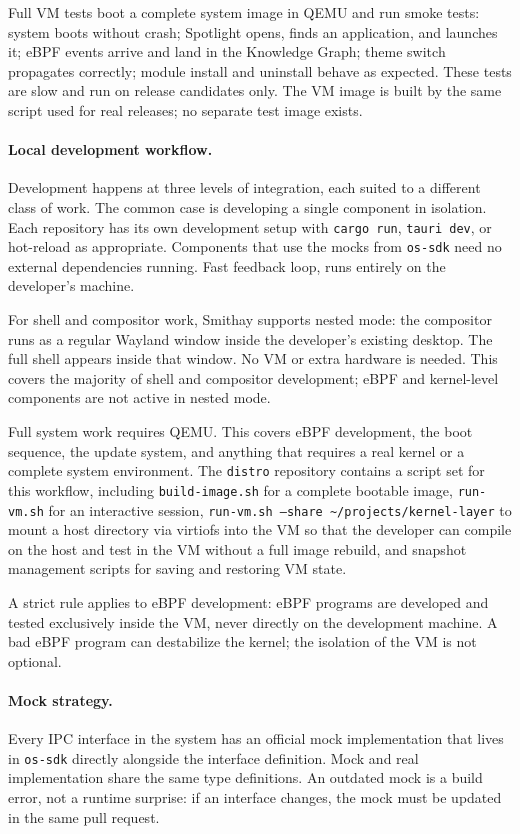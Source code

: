 Full VM tests boot a complete system image in QEMU and run smoke tests: system
boots without crash; Spotlight opens, finds an application, and launches it;
eBPF events arrive and land in the Knowledge Graph; theme switch propagates
correctly; module install and uninstall behave as expected. These tests are
slow and run on release candidates only. The VM image is built by the same
script used for real releases; no separate test image exists.

\paragraph{Local development workflow.}
Development happens at three levels of integration, each suited to a different
class of work. The common case is developing a single component in isolation.
Each repository has its own development setup with \texttt{cargo run},
\texttt{tauri dev}, or hot-reload as appropriate. Components that use the mocks
from \texttt{os-sdk} need no external dependencies running. Fast feedback loop,
runs entirely on the developer's machine.

For shell and compositor work, Smithay supports nested mode: the compositor
runs as a regular Wayland window inside the developer's existing desktop. The
full shell appears inside that window. No VM or extra hardware is needed. This
covers the majority of shell and compositor development; eBPF and kernel-level
components are not active in nested mode.

Full system work requires QEMU. This covers eBPF development, the boot
sequence, the update system, and anything that requires a real kernel or a
complete system environment. The \texttt{distro} repository contains a script
set for this workflow, including \texttt{build-image.sh} for a complete
bootable image, \texttt{run-vm.sh} for an interactive session,
\texttt{run-vm.sh --share \textasciitilde/projects/kernel-layer} to mount a
host directory via virtiofs into the VM so that the developer can compile on
the host and test in the VM without a full image rebuild, and snapshot
management scripts for saving and restoring VM state.

A strict rule applies to eBPF development: eBPF programs are developed and
tested exclusively inside the VM, never directly on the development machine.
A bad eBPF program can destabilize the kernel; the isolation of the VM is not
optional.

\paragraph{Mock strategy.}
Every IPC interface in the system has an official mock implementation that
lives in \texttt{os-sdk} directly alongside the interface definition. Mock and
real implementation share the same type definitions. An outdated mock is a
build error, not a runtime surprise: if an interface changes, the mock must be
updated in the same pull request.

